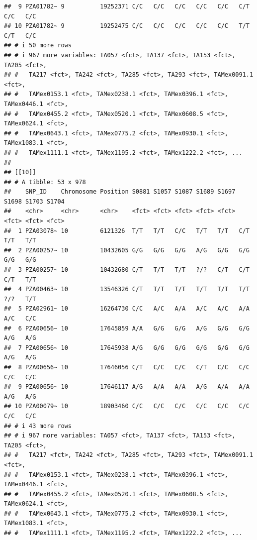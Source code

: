 \documentclass[
]{article}
\begin{document}
\begin{verbatim}
##  9 PZA01782~ 9          19252371 C/C   C/C   C/C   C/C   C/C   C/T   C/C   C/C  
## 10 PZA01782~ 9          19252475 C/C   C/C   C/C   C/C   C/C   T/T   C/T   C/C  
## # i 50 more rows
## # i 967 more variables: TA057 <fct>, TA137 <fct>, TA153 <fct>, TA205 <fct>,
## #   TA217 <fct>, TA242 <fct>, TA285 <fct>, TA293 <fct>, TAMex0091.1 <fct>,
## #   TAMex0153.1 <fct>, TAMex0238.1 <fct>, TAMex0396.1 <fct>, TAMex0446.1 <fct>,
## #   TAMex0455.2 <fct>, TAMex0520.1 <fct>, TAMex0608.5 <fct>, TAMex0624.1 <fct>,
## #   TAMex0643.1 <fct>, TAMex0775.2 <fct>, TAMex0930.1 <fct>, TAMex1083.1 <fct>,
## #   TAMex1111.1 <fct>, TAMex1195.2 <fct>, TAMex1222.2 <fct>, ...
## 
## [[10]]
## # A tibble: 53 x 978
##    SNP_ID    Chromosome Position S0881 S1057 S1087 S1689 S1697 S1698 S1703 S1704
##    <chr>     <chr>      <chr>    <fct> <fct> <fct> <fct> <fct> <fct> <fct> <fct>
##  1 PZA03078~ 10         6121326  T/T   T/T   C/C   T/T   T/T   C/T   T/T   T/T  
##  2 PZA00257~ 10         10432605 G/G   G/G   G/G   A/G   G/G   G/G   G/G   G/G  
##  3 PZA00257~ 10         10432680 C/T   T/T   T/T   ?/?   C/T   C/T   C/T   T/T  
##  4 PZA00463~ 10         13546326 C/T   T/T   T/T   T/T   T/T   T/T   ?/?   T/T  
##  5 PZA02961~ 10         16264730 C/C   A/C   A/A   A/C   A/C   A/A   A/C   C/C  
##  6 PZA00656~ 10         17645859 A/A   G/G   G/G   A/G   G/G   G/G   A/G   A/G  
##  7 PZA00656~ 10         17645938 A/G   G/G   G/G   G/G   G/G   G/G   A/G   A/G  
##  8 PZA00656~ 10         17646056 C/T   C/C   C/C   C/T   C/C   C/C   C/C   C/C  
##  9 PZA00656~ 10         17646117 A/G   A/A   A/A   A/G   A/A   A/A   A/G   A/G  
## 10 PZA00079~ 10         18903460 C/C   C/C   C/C   C/C   C/C   C/C   C/C   C/C  
## # i 43 more rows
## # i 967 more variables: TA057 <fct>, TA137 <fct>, TA153 <fct>, TA205 <fct>,
## #   TA217 <fct>, TA242 <fct>, TA285 <fct>, TA293 <fct>, TAMex0091.1 <fct>,
## #   TAMex0153.1 <fct>, TAMex0238.1 <fct>, TAMex0396.1 <fct>, TAMex0446.1 <fct>,
## #   TAMex0455.2 <fct>, TAMex0520.1 <fct>, TAMex0608.5 <fct>, TAMex0624.1 <fct>,
## #   TAMex0643.1 <fct>, TAMex0775.2 <fct>, TAMex0930.1 <fct>, TAMex1083.1 <fct>,
## #   TAMex1111.1 <fct>, TAMex1195.2 <fct>, TAMex1222.2 <fct>, ...
\end{verbatim}
\end{document}
